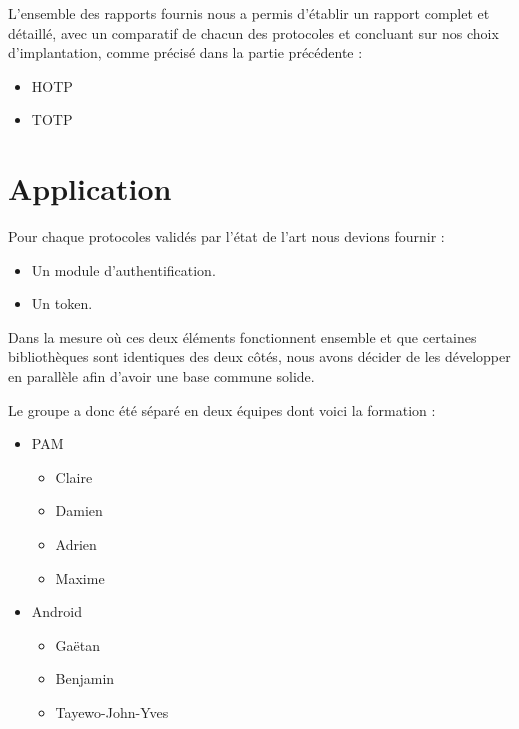     L'ensemble des rapports fournis nous a permis d'établir un rapport complet
    et détaillé, avec un comparatif de chacun des protocoles et concluant sur
    nos choix d'implantation, comme précisé dans la partie précédente :

    \begin{itemize}
      \item HOTP
      \item TOTP
    \end{itemize}


  \section{Application}

      Pour chaque protocoles validés par l'état de l'art nous devions fournir :

      \begin{itemize}
        \item Un module d'authentification.
        \item Un token.
      \end{itemize}

      Dans la mesure où ces deux éléments fonctionnent ensemble et que
      certaines bibliothèques sont identiques des deux côtés, nous avons
      décider de les développer en parallèle afin d'avoir une base commune
      solide.

      Le groupe a donc été séparé en deux équipes dont voici la formation :

      \begin{itemize}
        \item PAM
        \begin{itemize}
          \item Claire 
          \item Damien 
          \item Adrien 
          \item Maxime 
        \end{itemize}
        \item Android
        \begin{itemize}
          \item Gaëtan 
          \item Benjamin 
          \item Tayewo-John-Yves 
        \end{itemize}
      \end{itemize}


